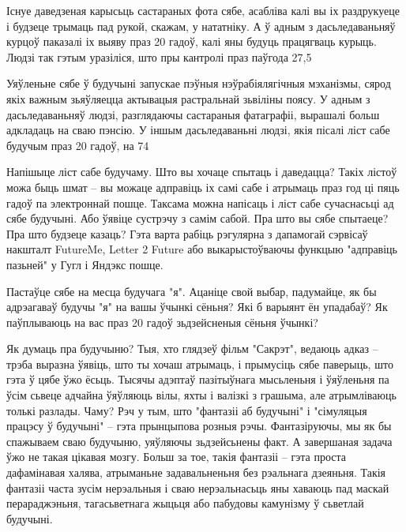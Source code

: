 Існуе даведзеная карысьць састараных фота сябе, асабліва калі вы іх раздрукуеце і будзеце трымаць пад рукой, скажам, у нататніку. А ў адным з дасьледаваньняў курцоў паказалі іх выяву праз 20 гадоў, калі яны будуць працягваць курыць. Людзі так гэтым уразіліся, што пры кантролі праз паўгода 27,5%

Уяўленьне сябе ў будучыні запускае пэўныя нэўрабіялягічныя мэханізмы, сярод якіх важным зьяўляецца актывацыя растральнай зьвіліны поясу. У адным з дасьледаваньняў людзі, разглядаючы састараныя фатаграфіі, вырашалі больш адкладаць на сваю пэнсію. У іншым дасьледаваньні людзі, якія пісалі ліст сабе будучым праз 20 гадоў, на 74%

Напішыце ліст сабе будучаму. Што вы хочаце спытаць і даведацца? Такіх лістоў можа быць шмат – вы можаце адправіць іх самі сабе і атрымаць праз год ці пяць гадоў па электроннай пошце. Таксама можна напісаць і ліст сабе сучаснасьці ад сябе будучыні. Або ўявіце сустрэчу з самім сабой. Пра што вы сябе спытаеце? Пра што будзеце казаць? Гэта варта рабіць рэгулярна з дапамогай сэрвісаў накшталт FutureMe, Letter 2 Future або выкарыстоўваючы функцыю "адправіць пазьней" у Гугл і Яндэкс пошце.

Пастаўце сябе на месца будучага "я". Ацаніце свой выбар, падумайце, як бы адрэагаваў будучы "я" на вашы ўчынкі сёньня? Які б варыянт ён упадабаў? Як паўплываюць на вас праз 20 гадоў зьдзейсненыя сёньня ўчынкі?

Як думаць пра будучыню? Тыя, хто глядзеў фільм "Сакрэт", ведаюць адказ – трэба выразна ўявіць, што ты хочаш атрымаць, і прымусіць сябе паверыць, што гэта ў цябе ўжо ёсьць. Тысячы адэптаў пазітыўнага мысьленьня і ўяўленьня па ўсім сьвеце адчайна ўяўляюць вілы, яхты і валізкі з грашыма, але атрымліваюць толькі разлады. Чаму? Рэч у тым, што "фантазіі аб будучыні" і "сімуляцыя працэсу ў будучыні" – гэта прынцыпова розныя рэчы. Фантазіруючы, мы як бы спажываем сваю будучыню, уяўляючы зьдзейсьнены факт. А завершаная задача ўжо не такая цікавая мозгу. Больш за тое, такія фантазіі – гэта проста дафамінавая халява, атрыманьне задавальненьня без рэальнага дзеяньня. Такія фантазіі часта зусім нерэальныя і сваю нерэальнасьць яны хаваюць пад маскай перараджэньня, тагасьветнага жыцьця або пабудовы камунізму ў сьветлай будучыні.

